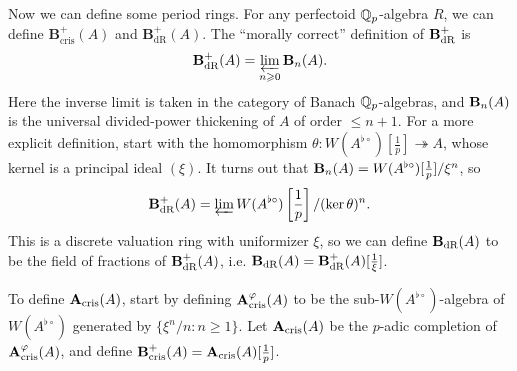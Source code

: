 Now we can define some period rings. For any perfectoid $\mathbb{Q}_p$-algebra $R$, 
we can define $\mathbf B_\text{cris}^+(A)$ and $\mathbf B_\text{dR}^+(A)$. 
The ``morally correct'' definition of $\mathbf{B}_\textnormal{dR}^+$ is 
\[
  \mathbf{B}_\textnormal{dR}^+(A) = \varprojlim_{n\geqslant 0} \mathbf{B}_n(A).
\]
Here the inverse limit is taken in the category of Banach $\mathbb{Q}_p$-algebras, and 
$\mathbf{B}_n(A)$ is the universal divided-power thickening of $A$ of order 
$\leqslant n+1$. For a more explicit definition, start with the homomorphism 
$\theta:W(A^{\flat\circ})[\frac 1 p] \twoheadrightarrow A$, whose kernel is 
a principal ideal $(\xi)$. It turns out that 
$\mathbf{B}_n(A) = W(A^{\flat\circ})[\frac 1 p]/\xi^n$, so 
\[
  \mathbf{B}_\textnormal{dR}^+(A) = \varprojlim W(A^{\flat\circ})\left[\frac 1 p\right]/(\ker\theta)^n .
\]
This is a discrete valuation ring with uniformizer $\xi$, so we can define 
$\mathbf{B}_\textnormal{dR}(A)$ to be the field of fractions of $\mathbf{B}_\textnormal{dR}^+(A)$, i.e. 
$\mathbf{B}_\textnormal{dR}(A)=\mathbf{B}_\textnormal{dR}^+(A)[\frac 1 \xi]$. 

To define $\mathbf{A}_\textnormal{cris}(A)$, start by defining $\mathbf{A}_\textnormal{cris}^\varphi(A)$ to be the 
sub-$W(A^{\flat\circ})$-algebra of $W(A^{\flat\circ})$ generated by 
$\{\xi^n/n:n\geqslant 1\}$. Let $\mathbf{A}_\textnormal{cris}(A)$ be the $p$-adic completion of 
$\mathbf{A}_\textnormal{cris}^\varphi(A)$, and define $\mathbf{B}_\textnormal{cris}^+(A) = \mathbf{A}_\textnormal{cris}(A)[\frac 1 p]$.



